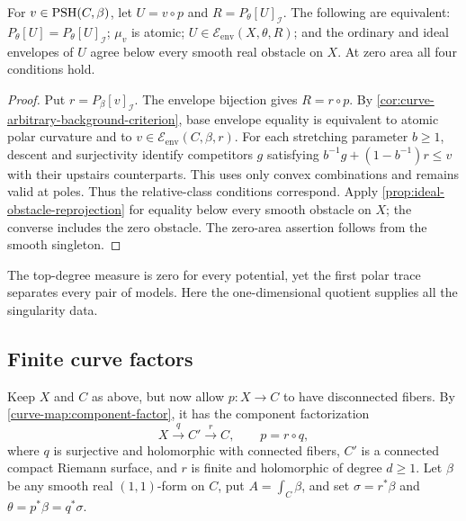\begin{corollary}\label{fibration:all-obstacle-criterion}
For $v\in\mathrm{PSH}(C,\beta)$, let $U=v\circ p$ and $R=P_\theta[U]_{\mathcal I}$. The following
are equivalent: $P_\theta[U]=P_\theta[U]_{\mathcal I}$;
$\mu_v$ is atomic; $U\in\mathcal E_{\mathrm{env}}(X,\theta,R)$;
and the ordinary and ideal envelopes of $U$ agree below every
smooth real obstacle on $X$. At zero area all four conditions hold.
\end{corollary}
\begin{proof}
Put $r=P_\beta[v]_{\mathcal I}$. The envelope bijection gives
$R=r\circ p$. By \cref{cor:curve-arbitrary-background-criterion},
base envelope equality is equivalent to atomic polar curvature
and to $v\in\mathcal E_{\mathrm{env}}(C,\beta,r)$.
For each stretching parameter $b\geq1$, descent and surjectivity
identify competitors $g$ satisfying
$b^{-1}g+(1-b^{-1})r\leq v$ with their upstairs counterparts.
This uses only convex combinations and remains valid at poles.
Thus the relative-class conditions correspond. Apply
\cref{prop:ideal-obstacle-reprojection} for equality below every
smooth obstacle on $X$; the converse includes the zero obstacle.
The zero-area assertion follows from the smooth singleton.
\end{proof}

The top-degree measure is zero for every potential, yet the
first polar trace separates every pair of models. Here the
one-dimensional quotient supplies all the singularity data.

\subsection{Finite curve factors}
\label{subsec:finite-curve-factors}

Keep $X$ and $C$ as above, but now allow $p\colon X\to C$ to have
disconnected fibers. By \cref{curve-map:component-factor}, it has
the component factorization
\[
 X\xrightarrow{q}C'\xrightarrow{r}C,
 \qquad p=r\circ q,
\]
where $q$ is surjective and holomorphic with connected fibers,
$C'$ is a connected compact Riemann surface, and $r$ is finite
and holomorphic of degree $d\geq1$. Let $\beta$ be any smooth
real $(1,1)$-form on $C$,
put $A=\int_C\beta$, and set $\sigma=r^*\beta$ and
$\theta=p^*\beta=q^*\sigma$.

